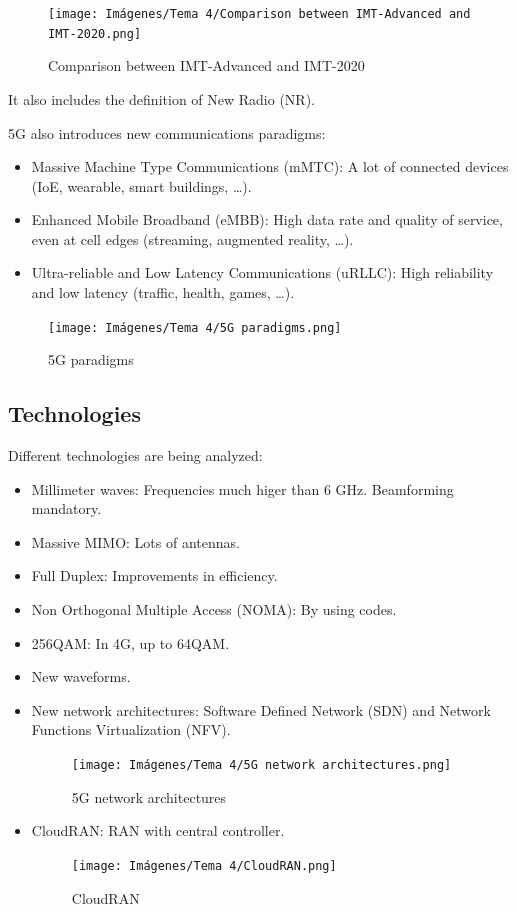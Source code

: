 \documentclass[
	12pt,
	twoside
]{book}
\begin{document}
\begin{figure}[H]
	\centering
	\texttt{[image: Imágenes/Tema 4/Comparison between IMT-Advanced and IMT-2020.png]}
	\caption{
		\label{fig:unit4_comparison_ad_2020}
		Comparison between IMT-Advanced and IMT-2020
	}
\end{figure}

It also includes the definition of New Radio (NR).

5G also introduces new communications paradigms:
\begin{itemize}
	\item Massive Machine Type Communications (mMTC): A lot of connected devices (IoE, wearable, smart buildings, \ldots).
	\item Enhanced Mobile Broadband (eMBB): High data rate and quality of service, even at cell edges (streaming, augmented reality, \ldots).
	\item Ultra-reliable and Low Latency Communications (uRLLC): High reliability and low latency (traffic, health, games, \ldots).
\end{itemize}

\begin{figure}[H]
	\centering
	\texttt{[image: Imágenes/Tema 4/5G paradigms.png]}
	\caption{
		\label{fig:unit4_5G_paradigms}
		5G paradigms
	}
\end{figure}

\subsection{Technologies}

Different technologies are being analyzed:
\begin{itemize}
	\item Millimeter waves: Frequencies much higer than 6 GHz. Beamforming mandatory.
	\item Massive MIMO: Lots of antennas.
	\item Full Duplex: Improvements in efficiency.
	\item Non Orthogonal Multiple Access (NOMA): By using codes.
	\item 256QAM: In 4G, up to 64QAM.
	\item New waveforms.
	\item {
		New network architectures: Software Defined Network (SDN) and Network Functions Virtualization (NFV).
		\begin{figure}[H]
			\centering
			\texttt{[image: Imágenes/Tema 4/5G network architectures.png]}
			\caption{
				\label{fig:unit4_5G_net_arch}
				5G network architectures
			}
		\end{figure}
	}
	\item {
		CloudRAN: RAN with central controller.
		\begin{figure}[H]
			\centering
			\texttt{[image: Imágenes/Tema 4/CloudRAN.png]}
			\caption{
				\label{fig:unit4_5G_CloudRAN}
				CloudRAN
			}
		\end{figure}
	}
\end{itemize}
\end{document}
